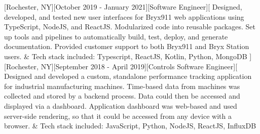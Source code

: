 \documentclass[showluaboxes=false]{resume}
\begin{document}
		[Rochester, NY][October 2019 - January 2021][Software Engineer][%
		Designed, developed, and tested new user interfaces for Bryx911 web applications using TypeScript, NodeJS, and ReactJS. %
		Modularized code into reusable packages. %
		Set up tools and pipelines to automatically build, test, deploy, and generate documentation. %
		Provided customer support to both Bryx911 and Bryx Station users.%
		&%
		Tech stack included: Typescript, ReactJS, Kotlin, Python, MongoDB
%
		]%
		[Rochester, NY][September 2018 - April 2019][Controls Software Engineer][%
		Designed and developed a custom, standalone performance tracking application for industrial manufacturing machines. Time-based data from machines was collected and stored by a backend process. Data could then be accessed and displayed via a dashboard. Application dashboard was web-based and used server-side rendering, so that it could be accessed from any device with a browser.
		&%
		Tech stack included: JavaScript, Python, NodeJS, ReactJS, InfluxDB%
\end{document}
